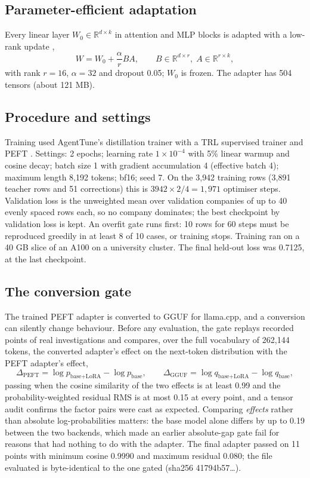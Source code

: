 \subsection{Parameter-efficient adaptation}
Every linear layer $W_0 \in \mathbb{R}^{d\times k}$ in attention and MLP blocks is adapted with a low-rank update
\citep{hu2022lora},
\begin{equation}
  W = W_0 + \frac{\alpha}{r} B A, \qquad B \in \mathbb{R}^{d\times r},\; A \in \mathbb{R}^{r\times k},
\end{equation}
with rank $r = 16$, $\alpha = 32$ and dropout 0.05; $W_0$ is frozen. The adapter has 504 tensors (about 121 MB).

\subsection{Procedure and settings}
Training used AgentTune's distillation trainer \citep{agenttune} with a TRL supervised trainer \citep{trl} and PEFT
\citep{peft}. Settings: 2 epochs; learning rate $1\times10^{-4}$ with 5\% linear warmup and cosine decay; batch size 1
with gradient accumulation 4 (effective batch 4); maximum length 8{,}192 tokens; bf16; seed 7. On the 3{,}942 training
rows (3{,}891 teacher rows and 51 corrections) this is $3942 \times 2 / 4 = 1{,}971$ optimiser steps. Validation loss is
the unweighted mean over validation companies of up to 40 evenly spaced rows each, so no company dominates; the best
checkpoint by validation loss is kept. An overfit gate runs first: 10 rows for 60 steps must be reproduced greedily in
at least 8 of 10 cases, or training stops. Training ran on a 40 GB slice of an A100 on a university cluster. The final
held-out loss was 0.7125, at the last checkpoint.

\subsection{The conversion gate}
The trained PEFT adapter is converted to GGUF for llama.cpp, and a conversion can silently change behaviour. Before any
evaluation, the gate replays recorded points of real investigations and compares, over the full vocabulary of 262{,}144
tokens, the converted adapter's effect on the next-token distribution with the PEFT adapter's effect,
\begin{equation}
  \Delta_{\text{PEFT}} = \log p_{\text{base+LoRA}} - \log p_{\text{base}}, \qquad
  \Delta_{\text{GGUF}} = \log q_{\text{base+LoRA}} - \log q_{\text{base}},
\end{equation}
passing when the cosine similarity of the two effects is at least 0.99 and the probability-weighted residual RMS is at
most 0.15 at every point, and a tensor audit confirms the factor pairs were cast as expected. Comparing \emph{effects}
rather than absolute log-probabilities matters: the base model alone differs by up to 0.19 between the two backends, which
made an earlier absolute-gap gate fail for reasons that had nothing to do with the adapter. The final adapter passed on
11 points with minimum cosine 0.9990 and maximum residual 0.080; the file evaluated is byte-identical to the one gated
(sha256 41794b57\ldots).
